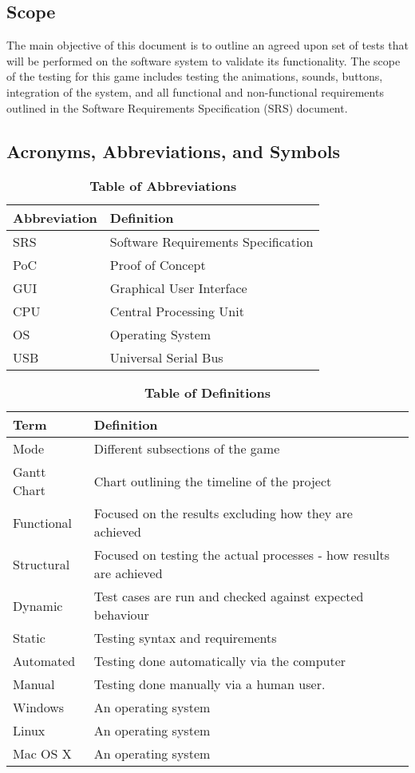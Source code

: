 \documentclass[12pt, titlepage]{article}
\begin{document}
\subsection{Scope}

\par The main objective of this document is to outline an agreed upon set of tests that will be performed on the software system to validate its functionality. The scope of the testing for this game includes testing the animations, sounds, buttons, integration of the system, and all functional and non-functional requirements outlined in the Software Requirements Specification (SRS) document.


\subsection{Acronyms, Abbreviations, and Symbols}
	
\begin{table}[hbp]
\caption{\textbf{Table of Abbreviations}} \label{Table}
\begin{tabularx}{\textwidth}{p{3cm}X}
\toprule
\textbf{Abbreviation} & \textbf{Definition} \\
\midrule
SRS & Software Requirements Specification\\
PoC & Proof of Concept\\
GUI & Graphical User Interface\\
CPU & Central Processing Unit\\
OS & Operating System\\
USB & Universal Serial Bus\\

\bottomrule
\end{tabularx}
\end{table}


\begin{table}[!htbp]
\caption{\textbf{Table of Definitions}} \label{Table}
\begin{tabularx}{\textwidth}{p{3cm}X}
\toprule
\textbf{Term} & \textbf{Definition}\\
\midrule
Mode & Different subsections of the game\\
Gantt Chart & Chart outlining the timeline of the project\\
Functional  & Focused on the results excluding how they are achieved \\
Structural & Focused on testing the actual processes - how results are achieved\\
Dynamic  & Test cases are run and checked against expected behaviour\\
Static & Testing syntax and requirements\\
Automated  & Testing done automatically via the computer\\ 
Manual  & Testing done manually via a human user.\\
Windows & An operating system\\
Linux & An operating system\\
Mac OS X & An operating system\\

\bottomrule
\end{tabularx}
\end{table}	
\end{document}
